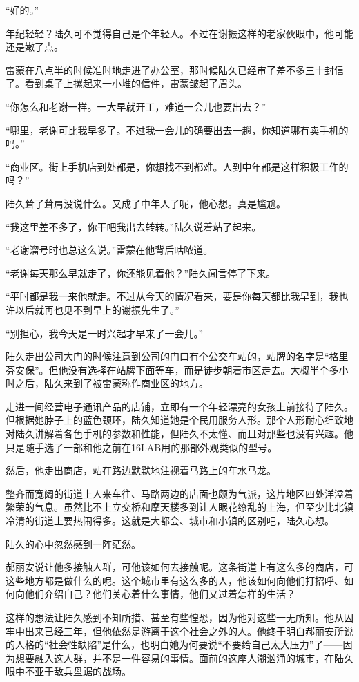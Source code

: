 “好的。”

年纪轻轻？陆久可不觉得自己是个年轻人。不过在谢振这样的老家伙眼中，他可能还是嫩了点。

雷蒙在八点半的时候准时地走进了办公室，那时候陆久已经审了差不多三十封信了。看到桌子上摞起来一小堆的信件，雷蒙皱起了眉头。

“你怎么和老谢一样。一大早就开工，难道一会儿也要出去？”

“哪里，老谢可比我早多了。不过我一会儿的确要出去一趟，你知道哪有卖手机的吗。”

“商业区。街上手机店到处都是，你想找不到都难。人到中年都是这样积极工作的吗？”

陆久耸了耸肩没说什么。又成了中年人了呢，他心想。真是尴尬。

“我这里差不多了，你干吧我出去转转。”陆久说着站了起来。

“老谢溜号时也总这么说。”雷蒙在他背后咕哝道。

“老谢每天那么早就走了，你还能见着他？”陆久闻言停了下来。

“平时都是我一来他就走。不过从今天的情况看来，要是你每天都比我早到，我也许以后就再也见不到早上的谢振先生了。”

“别担心，我今天是一时兴起才早来了一会儿。”

陆久走出公司大门的时候注意到公司的门口有个公交车站的，站牌的名字是“格里芬安保”。但他没有选择在站牌下面等车，而是徒步朝着市区走去。大概半个多小时之后，陆久来到了被雷蒙称作商业区的地方。

走进一间经营电子通讯产品的店铺，立即有一个年轻漂亮的女孩上前接待了陆久。但根据她脖子上的蓝色颈环，陆久知道她是个民用服务人形。那个人形耐心细致地对陆久讲解着各色手机的参数和性能，但陆久不太懂、而且对那些也没有兴趣。他只是随手选了一部和他之前在16LAB用的那部外观类似的型号。

然后，他走出商店，站在路边默默地注视着马路上的车水马龙。

整齐而宽阔的街道上人来车往、马路两边的店面也颇为气派，这片地区四处洋溢着繁荣的气息。虽然比不上立交桥和摩天楼多到让人眼花缭乱的上海，但至少比北镇冷清的街道上要热闹得多。这就是大都会、城市和小镇的区别吧，陆久心想。

陆久的心中忽然感到一阵茫然。

郝丽安说让他多接触人群，可他该如何去接触呢。这条街道上有这么多的商店，可这些地方都是做什么的呢。这个城市里有这么多的人，他该如何向他们打招呼、如何向他们介绍自己？他们关心着什么事情，他们又过着怎样的生活？

这样的想法让陆久感到不知所措、甚至有些惶恐，因为他对这些一无所知。他从囚牢中出来已经三年，但他依然是游离于这个社会之外的人。他终于明白郝丽安所说的人格的“社会性缺陷”是什么，也明白她为何要说“不要给自己太大压力”了——因为想要融入这人群，并不是一件容易的事情。面前的这座人潮汹涌的城市，在陆久眼中不亚于敌兵盘踞的战场。

